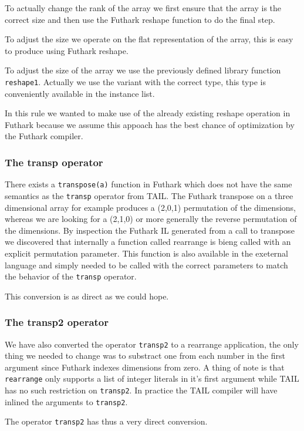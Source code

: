 \documentclass[11pt]{article}
\begin{document}
To actually change the rank of the array we first ensure that the array is the correct size and then use the Futhark reshape
function to do the final step.

To adjust the size we operate on the flat representation of the array, this is easy to produce using Futhark reshape.

To adjust the size of the array we use the previously defined library function {\tt reshape1}. Actually we use the variant with
the correct type, this type is conveniently available in the instance list.

In this rule we wanted to make use of the already existing reshape operation in Futhark because we assume this appoach has the best
chance of optimization by the Futhark compiler.

\subsubsection{The transp operator} 
There exists a {\tt transpose(a)} function in Futhark which does not have the same semantics as the {\tt transp} operator from TAIL.
The Futhark transpose on a three dimensional array for example produces a (2,0,1) permutation of the dimensions, whereas we are
looking for a (2,1,0) or more generally the reverse permutation of the dimensions. By inspection the Futhark IL generated from
a call to transpose we discovered that internally a function called rearrange is bieng called with an explicit permutation parameter.
This function is also available in the exeternal language and simply needed to be called with the correct parameters to match
the behavior of the {\tt transp} operator.

This conversion is as direct as we could hope.

\subsubsection{The transp2 operator} 
We have also converted the operator {\tt transp2} to a rearrange application, the only thing we needed to change was to substract
one from each number in the first argument since Futhark indexes dimensions from zero.
A thing of note is that {\tt rearrange} only supports a list of integer literals in it's first argument while TAIL has no
such restriction on {\tt transp2}. In practice the TAIL compiler will have inlined the arguments to {\tt transp2}.

The operator {\tt transp2} has thus a very direct conversion.
\end{document}
